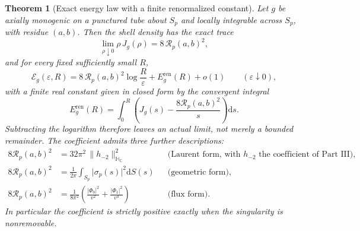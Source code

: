 \documentclass[11pt,a4paper]{article}
\numberwithin{equation}{section}
\newtheorem{theorem}{Theorem}[section]
\theoremstyle{definition}
\theoremstyle{remark}
\theoremstyle{plain}
\newcommand{\HC}{\mathbb H_{\mathbb C}}
\newcommand{\Sp}{S_{p}}
\newcommand{\Rp}{\mathcal R_{p}}      %
\newcommand{\Eg}{\mathcal E_{g}}
\newcommand{\Jg}{J_{g}}
\newcommand{\Eren}{E^{\mathrm{ren}}}
\newcommand{\abs}[1]{\lvert #1\rvert}
\newcommand{\norm}[1]{\lVert #1\rVert}
\newcommand{\dd}{\mathrm d}
\begin{document}
\begin{theorem}[Exact energy law with a finite renormalized constant]
\label{e:thm:energy}
Let $g$ be axially monogenic on a punctured tube about $\Sp$ and locally
integrable across $\Sp$, with residue $(a,b)$. Then the shell density has
the exact trace
\begin{equation}
 \lim_{\rho\downarrow0}\rho\,\Jg(\rho)=8\,\Rp(a,b)^2,
 \label{e:eq:shelltrace}
\end{equation}
and for every fixed sufficiently small $R$,
\begin{equation}
 \Eg(\varepsilon,R)
  =8\,\Rp(a,b)^2\log\frac R\varepsilon+\Eren_g(R)+o(1)
  \qquad(\varepsilon\downarrow0),
 \label{e:eq:energylaw}
\end{equation}
with a \emph{finite} real constant given in closed form by the convergent
integral
\begin{equation}
 \Eren_g(R)=\int_0^{R}\left(\Jg(s)-\frac{8\Rp(a,b)^2}{s}\right)\dd s .
 \label{e:eq:Eren}
\end{equation}
Subtracting the logarithm therefore leaves an actual limit, not merely a
bounded remainder. The coefficient admits three further descriptions:
\begin{align}
 8\Rp(a,b)^2
 &=32\pi^2\,\norm{h_{-2}}_{\HC}^2
 &&\text{(Laurent form, with $h_{-2}$ the coefficient of Part~III),}
 \label{e:eq:coef-laurent}\\
 8\Rp(a,b)^2
 &=\frac1{2\pi}\int_{\Sp}\abs{\sigma_p(s)}^2\dd S(s)
 &&\text{(geometric form),}
 \label{e:eq:coef-source}\\
 8\Rp(a,b)^2
 &=\frac1{8\pi^2}\left(\frac{\abs{\Phi_0}^2}{v^2}
                       +\frac{\abs{\Phi_1}^2}{v^4}\right)
 &&\text{(flux form).}
 \label{e:eq:coef-flux}
\end{align}
In particular the coefficient is strictly positive exactly when the
singularity is nonremovable.
\end{theorem}
\end{document}

